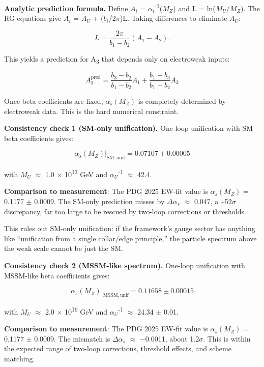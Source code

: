 \documentclass[11pt,a4paper]{article}
\theoremstyle{remark}
\begin{document}
\textbf{Analytic prediction formula.} Define \(A_i\) = \(\ensuremath{\alpha}_i\)\textsuperscript{-1}(\(M_Z\)) and
L = ln(\(M_U/M_Z\)). The RG equations give \(A_i\) = \(A_U\) + (\(b_i\)/2\ensuremath{\pi})L. Taking
differences to eliminate \(A_U\):

\[
L = \frac{2\pi}{b_1 - b_2}(A_1 - A_2).
\]

This yields a prediction for A\textsubscript{3} that depends only on electroweak inputs:

\[
A_3^\mathrm{pred} = \frac{b_3 - b_2}{b_1 - b_2} A_1 + \frac{b_1 - b_3}{b_1 - b_2} A_2
\]

Once beta coefficients are fixed, \(\ensuremath{\alpha}_s(M_Z)\) is completely determined by
electroweak data. This is the hard numerical constraint.

\textbf{Consistency check 1 (SM-only unification).} One-loop unification with SM beta
coefficients gives:

\[
\alpha_s(M_Z)|_\mathrm{SM,unif} = 0.07107 \pm 0.00005
\]

with \(M_U\) \ensuremath{\approx} 1.0 \ensuremath{\times} 10\textsuperscript{13} GeV and \(\ensuremath{\alpha}_U\)\textsuperscript{-1} \ensuremath{\approx} 42.4.

\textbf{Comparison to measurement}: The PDG 2025 EW-fit value is
\(\ensuremath{\alpha}_s(M_Z)\) = 0.1177 \ensuremath{\pm} 0.0009. The SM-only prediction misses by
\(\ensuremath{\Delta}\ensuremath{\alpha}_s\) \ensuremath{\approx} 0.047, a \textasciitilde52\ensuremath{\sigma} discrepancy, far too large to be rescued
by two-loop corrections or thresholds.

This rules out SM-only unification: if the framework's gauge sector has anything
like ``unification from a single collar/edge principle,'' the particle spectrum
above the weak scale cannot be just the SM.

\textbf{Consistency check 2 (MSSM-like spectrum).} One-loop unification with MSSM-like
beta coefficients gives:

\[
\alpha_s(M_Z)|_\mathrm{MSSM,unif} = 0.11658 \pm 0.00015
\]

with \(M_U\) \ensuremath{\approx} 2.0 \ensuremath{\times} 10\textsuperscript{16} GeV and \(\ensuremath{\alpha}_U\)\textsuperscript{-1} \ensuremath{\approx} 24.34 \ensuremath{\pm} 0.01.

\textbf{Comparison to measurement}: The PDG 2025 EW-fit value is
\(\ensuremath{\alpha}_s(M_Z)\) = 0.1177 \ensuremath{\pm} 0.0009. The mismatch is
\(\ensuremath{\Delta}\ensuremath{\alpha}_s\) \ensuremath{\approx} \ensuremath{-}0.0011, about 1.2\ensuremath{\sigma}. This is within the
expected range of two-loop corrections, threshold effects, and scheme
matching.
\end{document}
